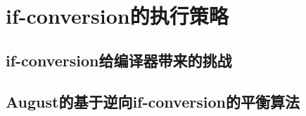 \section{if-conversion的执行策略}

\subsection{if-conversion给编译器带来的挑战}
\subsection{August的基于逆向if-conversion的平衡算法}
